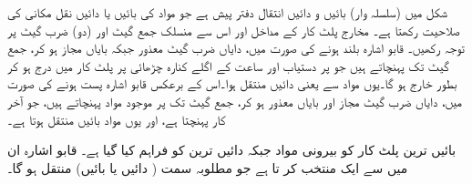 شکل   میں   (سلسلہ وار) بائیں و دائیں  انتقال دفتر پیش ہے جو  مواد کی بائیں یا دائیں  نقل مکانی کی صلاحیت رکھتا ہے۔ مخارج    پلٹ کار کے مداخل  اور اس سے منسلک جمع گیٹ  اور (دو)  ضرب گیٹ  پر توجہ رکھیں۔  قابو اشارہ   بلند ہونے کی صورت میں، دایاں ضرب گیٹ معذور جبکہ بایاں  مجاز ہو کر،     جمع گیٹ تک   پہنچاتے ہیں جو   پر دستیاب اور   ساعت کے اگلے کنارہ چڑھائی پر پلٹ کار میں درج ہو کر بطور  خارج ہو گا۔یوں مواد  سے  یعنی دائیں منتقل ہوا۔اس کے برعکس قابو اشارہ پست ہونے کی صورت میں، دایاں ضرب گیٹ مجاز  اور بایاں معذور ہو کر،   جمع گیٹ تک   پر موجود مواد    پہنچاتے ہیں، جو  آخر کار   پہنچتا  ہے، اور یوں مواد بائیں منتقل ہوتا ہے۔

 بائیں ترین پلٹ کار کو بیرونی مواد   جبکہ دائیں ترین کو  فراہم کیا گیا ہے۔ قابو اشارہ ان میں سے ایک منتخب کر تا ہے جو مطلوبہ سمت ( دائیں یا بائیں) منتقل ہو گا۔   

